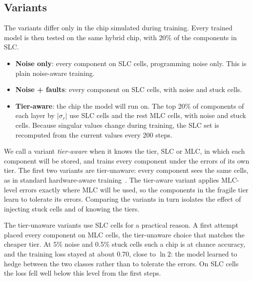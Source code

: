 \subsection{Variants}
The variants differ only in the chip simulated during training. Every trained model is then tested on
the same hybrid chip, with 20\% of the components in SLC.
\begin{itemize}
\item \textbf{Noise only}: every component on SLC cells, programming noise only. This is plain
noise-aware training.
\item \textbf{Noise + faults}: every component on SLC cells, with noise and stuck cells.
\item \textbf{Tier-aware}: the chip the model will run on. The top 20\% of components of each layer by
$|\sigma_r|$ use SLC cells and the rest MLC cells, with noise and stuck cells. Because singular values
change during training, the SLC set is recomputed from the current values every 200 steps.
\end{itemize}
We call a variant \emph{tier-aware} when it knows the tier, SLC or MLC, in which each component will be
stored, and trains every component under the errors of its own tier. The first two variants are
tier-unaware: every component sees the same cells, as in standard hardware-aware
training~\cite{rasch2023hwa}. The tier-aware variant applies MLC-level errors exactly where MLC will be
used, so the components in the fragile tier learn to tolerate its errors. Comparing the variants in turn
isolates the effect of injecting stuck cells and of knowing the tiers.

The tier-unaware variants use SLC cells for a practical reason. A first attempt placed every component on
MLC cells, the tier-unaware choice that matches the cheaper tier. At 5\% noise and 0.5\% stuck cells such
a chip is at chance accuracy, and the training loss stayed at about 0.70, close to $\ln 2$: the model
learned to hedge between the two classes rather than to tolerate the errors. On SLC cells the loss fell
well below this level from the first steps.
